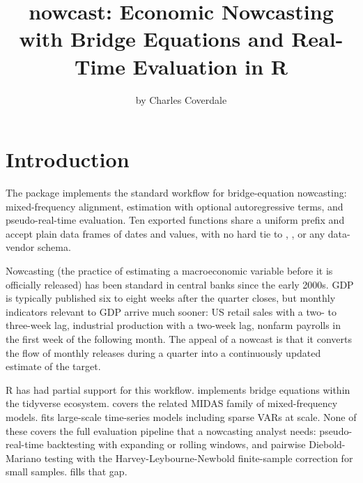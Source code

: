 \title{nowcast: Economic Nowcasting with Bridge Equations and Real-Time Evaluation in R}


\author{by Charles Coverdale}

\maketitle


\section{Introduction}\label{introduction}

The  package implements the standard workflow for
bridge-equation nowcasting: mixed-frequency alignment, estimation
with optional autoregressive terms, and pseudo-real-time evaluation.
Ten exported functions share a uniform  prefix and accept
plain data frames of dates and values, with no hard tie to
, , or any data-vendor schema.

Nowcasting (the practice of estimating a macroeconomic variable
before it is officially released) has been standard in central banks
since the early 2000s. GDP is typically published six to eight weeks
after the quarter closes, but monthly indicators relevant to GDP
arrive much sooner: US retail sales with a two- to three-week lag,
industrial production with a two-week lag, nonfarm payrolls in the
first week of the following month. The appeal of a nowcast is that
it converts the flow of monthly releases during a quarter into a
continuously updated estimate of the target.

R has had partial support for this workflow. 
implements bridge equations within the tidyverse ecosystem.
 covers the related MIDAS family of mixed-frequency
models.  fits large-scale time-series models
including sparse VARs at scale. None of these covers the full
evaluation pipeline that a nowcasting analyst needs:
pseudo-real-time backtesting with expanding or rolling windows, and
pairwise Diebold-Mariano testing with the Harvey-Leybourne-Newbold
finite-sample correction for small samples.  fills
that gap.

